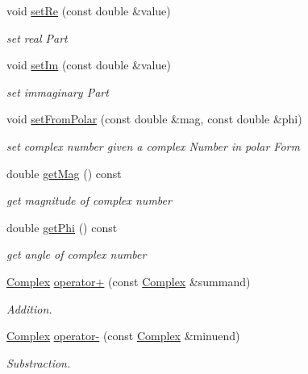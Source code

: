 \begin{DoxyCompactItemize}
void \mbox{\hyperlink{class_complex_ab0c48d63855dd6f61c750450e8a7efa8}{set\+Re}} (const double \&value)
\begin{DoxyCompactList}\small\item\em set real Part \end{DoxyCompactList}\item 
void \mbox{\hyperlink{class_complex_ac63d8b924962371c0b2c448661d4ae84}{set\+Im}} (const double \&value)
\begin{DoxyCompactList}\small\item\em set immaginary Part \end{DoxyCompactList}\item 
void \mbox{\hyperlink{class_complex_afc43a328b0288a31144aeaf4185b0d7d}{set\+From\+Polar}} (const double \&mag, const double \&phi)
\begin{DoxyCompactList}\small\item\em set complex number given a complex Number in polar Form \end{DoxyCompactList}\item 
double \mbox{\hyperlink{class_complex_a58e5404efd8f49c034be2ab82af53461}{get\+Mag}} () const
\begin{DoxyCompactList}\small\item\em get magnitude of complex number \end{DoxyCompactList}\item 
double \mbox{\hyperlink{class_complex_a4eb4ecde5a206cae05fd0b6500f22fff}{get\+Phi}} () const
\begin{DoxyCompactList}\small\item\em get angle of complex number \end{DoxyCompactList}\item 
\mbox{\hyperlink{class_complex}{Complex}} \mbox{\hyperlink{class_complex_a4c1189414fa16c6d8115c90ce2f29d78}{operator+}} (const \mbox{\hyperlink{class_complex}{Complex}} \&summand)
\begin{DoxyCompactList}\small\item\em Addition. \end{DoxyCompactList}\item 
\mbox{\hyperlink{class_complex}{Complex}} \mbox{\hyperlink{class_complex_a8f880f1056308d876fd50aad9244e8d2}{operator-\/}} (const \mbox{\hyperlink{class_complex}{Complex}} \&minuend)
\begin{DoxyCompactList}\small\item\em Substraction. \end{DoxyCompactList}\item 

\end{DoxyCompactItemize}
